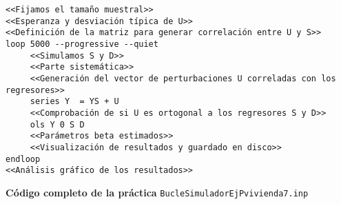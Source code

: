 \documentclass[11pt]{article}
\begin{document}
\begin{verbatim}
<<Fijamos el tamaño muestral>>
<<Esperanza y desviación típica de U>>
<<Definición de la matriz para generar correlación entre U y S>>
loop 5000 --progressive --quiet
     <<Simulamos S y D>>
     <<Parte sistemática>>
     <<Generación del vector de perturbaciones U correladas con los regresores>>
     series Y  = YS + U
     <<Comprobación de si U es ortogonal a los regresores S y D>>
     ols Y 0 S D
     <<Parámetros beta estimados>>
     <<Visualización de resultados y guardado en disco>>
endloop
<<Análisis gráfico de los resultados>>
\end{verbatim}

\clearpage
\noindent
\textbf{Código completo de la práctica} \texttt{BucleSimuladorEjPvivienda7.inp}
\vspace{10pt}

\clearpage
\end{document}
